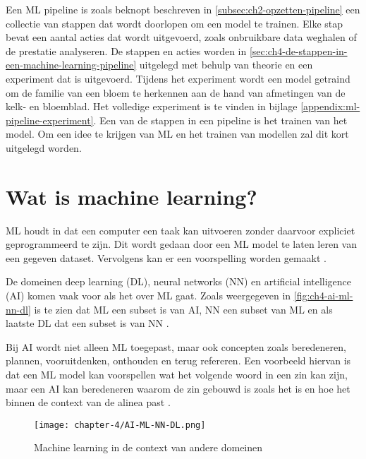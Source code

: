  
Een ML pipeline is zoals beknopt beschreven in \autoref{subsec:ch2-opzetten-pipeline} een collectie van stappen dat wordt doorlopen om een model te trainen. Elke stap bevat een aantal acties dat wordt uitgevoerd, zoals onbruikbare data weghalen of de prestatie analyseren. De stappen en acties worden in \autoref{sec:ch4-de-stappen-in-een-machine-learning-pipeline} uitgelegd met behulp van theorie en een experiment dat is uitgevoerd. Tijdens het experiment wordt een model getraind om de familie van een bloem te herkennen aan de hand van afmetingen van de kelk- en bloemblad. Het volledige experiment is te vinden in bijlage \ref{appendix:ml-pipeline-experiment}. Een van de stappen in een pipeline is het trainen van het model. Om een idee te krijgen van ML en het trainen van modellen zal dit kort uitgelegd worden.

\section{Wat is machine learning?}\label{sec:ch4-wat-is-machine-learning}
ML houdt in dat een computer een taak kan uitvoeren zonder daarvoor expliciet geprogrammeerd te zijn. Dit wordt gedaan door een ML model te laten leren van een gegeven dataset. Vervolgens kan er een voorspelling worden gemaakt \cite[p.~1-3]{introduction-to-machine-learning}.

De domeinen deep learning (DL), neural networks (NN) en artificial intelligence (AI) komen vaak voor als het over ML gaat. Zoals weergegeven in \autoref{fig:ch4-ai-ml-nn-dl} is te zien dat ML een subset is van AI, NN een subset van ML en als laatste DL dat een subset is van NN \cite{ai-ml-nn-dl}. 

Bij AI wordt niet alleen ML toegepast, maar ook concepten zoals beredeneren, plannen, vooruitdenken, onthouden en terug refereren. Een voorbeeld hiervan is dat een ML model kan voorspellen wat het volgende woord in een zin kan zijn, maar een AI kan beredeneren waarom de zin gebouwd is zoals het is en hoe het binnen de context van de alinea past \cite{ml-think-about-ml-brownlee}.

\begin{figure}[hbt!]
  \centering
  \texttt{[image: chapter-4/AI-ML-NN-DL.png]}
  \caption{Machine learning in de context van andere domeinen}
  \label{fig:ch4-ai-ml-nn-dl}
\end{figure}

